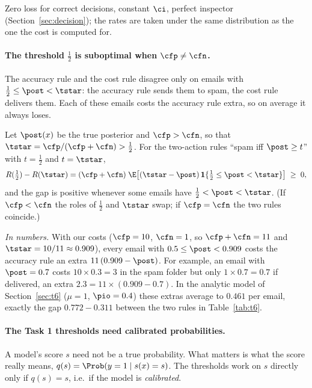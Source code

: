 \begin{assumptions}
Zero loss for correct decisions, constant $\ci$, perfect inspector (Section~\ref{sec:decision});
the rates are taken under the same distribution as the one the cost is computed for.
\end{assumptions}

\paragraph{The threshold $\tfrac12$ is suboptimal when $\cfp\ne\cfn$.}
The accuracy rule and the cost rule disagree only on emails with $\tfrac12\le\post<\tstar$: the
accuracy rule sends them to spam, the cost rule delivers them. Each of these emails costs the
accuracy rule extra, so on average it always loses.

\begin{proposition}\label{prop:t3-half}
Let $\post(x)$ be the true posterior and $\cfp>\cfn$, so that $\tstar=\cfp/(\cfp+\cfn)>\tfrac12$.
For the two-action rules ``spam iff $\post\ge t$'' with $t=\tfrac12$ and $t=\tstar$,
\[
  R(\tfrac12) - R(\tstar) = (\cfp+\cfn)\;\E\big[(\tstar-\post)\,\mathbf 1\{\tfrac12\le\post<\tstar\}\big] \;\ge\; 0 ,
\]
and the gap is positive whenever some emails have $\tfrac12<\post<\tstar$.
(If $\cfp<\cfn$ the roles of $\tfrac12$ and $\tstar$ swap; if $\cfp=\cfn$ the two rules coincide.)
\end{proposition}

\emph{In numbers.} With our costs ($\cfp=10$, $\cfn=1$, so $\cfp+\cfn=11$ and $\tstar=10/11\approx0.909$),
every email with $0.5\le\post<0.909$ costs the accuracy rule an extra $11\,(0.909-\post)$. For example, an
email with $\post=0.7$ costs $10\times0.3=3$ in the spam folder but only $1\times0.7=0.7$ if delivered, an
extra $2.3=11\times(0.909-0.7)$. In the analytic model of Section~\ref{sec:t6} ($\mu=1$, $\pio=0.4$) these
extras average to $0.461$ per email, exactly the gap $0.772-0.311$ between the two rules in
Table~\ref{tab:t6}.

\paragraph{The Task 1 thresholds need calibrated probabilities.}
A model's score $s$ need not be a true probability. What matters is what the score really means,
$q(s)=\Prob(y=1\mid s(x)=s)$. The thresholds work on $s$ directly only if $q(s)=s$, i.e.\ if the model
is \emph{calibrated}.

